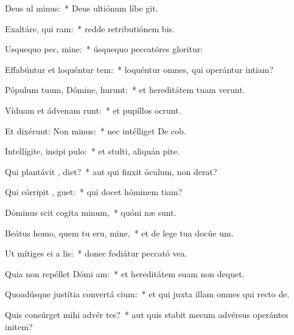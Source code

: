 \item Deus ul minus:~* Deus ultiónum líbe git.
\item Exaltáre, qui  ram:~* redde retributiónem bis.
\item Usquequo pec, mine:~* úsquequo peccatóres gloritur:
\item Effabúntur et loquéntur tem:~* loquéntur omnes, qui operántur intiam?
\item Pópulum tuum, Dómine, hurunt:~* et hereditátem tuam verunt.
\item Víduam et ádvenam runt:~* et pupíllos ocrunt.
\item Et dixérunt: Non  minus:~* nec intélliget De cob.
\item Intellígite, insipi  pulo:~* et stulti, aliquán pite.
\item Qui plantávit ,  diet?~* aut qui finxit óculum, non derat?
\item Qui córripit ,  guet:~* qui docet hóminem tiam?
\item Dóminus scit cogita minum,~* quóni næ sunt.
\item Beátus homo, quem tu eru, mine,~* et de lege tua docúe um.
\item Ut mítiges ei a  lis:~* donec fodiátur peccató vea.
\item Quia non repéllet Dómi  am:~* et hereditátem suam non dequet.
\item Quoadúsque justítia convertá  cium:~* et qui juxta illam omnes qui recto  de.
\item Quis consúrget mihi advér tes?~* aut quis stabit mecum advérsus operántes initem?
